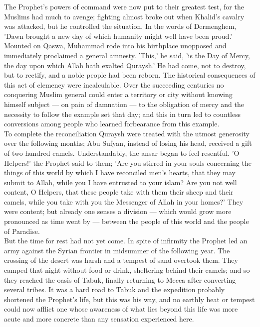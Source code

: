 \documentclass[10pt, twoside]{book}
\begin{document}
The Prophet's powers of command were now put to their greatest test, for the Muslims had much to 
avenge; fighting almost broke out when Khalid's cavalry was attacked, but he controlled the 
situation. In the words of Dermenghem, 'Dawn brought a new day of which humanity might well have been 
proud.' Mounted on Qaswa, Muhammad rode into his birthplace unopposed and immediately proclaimed a 
general amnesty. 'This,' he said, 'is the Day of Mercy, the day upon which Allah hath exalted 
Quraysh.' He had come, not to destroy, but to rectify, and a noble people had been reborn. The 
historical consequences of this act of clemency were incalculable. Over the succeeding centuries no 
conquering Muslim general could enter a territory or city without knowing himself subject --- on pain 
of damnation --- to the obligation of mercy and the necessity to follow the example set that day; and 
this in turn led to countless conversions among people who learned forbearance from this example. \\

To complete the reconciliation Quraysh were treated with the utmost generosity over the following 
months; Abu Sufyan, instead of losing his head, received a gift of two hundred camels. 
Understandably, the ansar began to feel resentful. 'O Helpers!' the Prophet said to them; 'Are you 
stirred in your souls concerning the things of this world by which I have reconciled men's hearts, 
that they may submit to Allah, while you I have entrusted to your islam? Are you not well content, O 
Helpers, that these people take with them their sheep and their camels, while you take with you the 
Messenger of Allah in your homes?' They were content; but already one senses a division --- which would 
grow more pronounced as time went by --- between the people of this world and the people of Paradise. \\

But the time for rest had not yet come. In spite of infirmity the Prophet led an army against the 
Syrian frontier in midsummer of the following year. The crossing of the desert was harsh and a 
tempest of sand overtook them. They camped that night without food or drink, sheltering behind their 
camels; and so they reached the oasis of Tabuk, finally returning to Mecca after converting several 
tribes. It was a hard road to Tabuk and the expedition probably shortened the Prophet's life, but 
this was his way, and no earthly heat or tempest could now afflict one whose awareness of what lies 
beyond this life was more acute and more concrete than any sensation experienced here. \\
\end{document}
